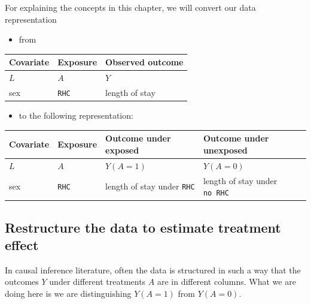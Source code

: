 \documentclass[
]{book}
\providecommand{\tightlist}{%
  \setlength{\itemsep}{0pt}\setlength{\parskip}{0pt}}
\begin{document}
\begin{rmdcomment}
For explaining the concepts in this chapter, we will convert our data
representation
\end{rmdcomment}

\begin{itemize}
\tightlist
\item
  from
\end{itemize}

\begin{longtable}[]{@{}lll@{}}
\toprule
Covariate & Exposure & Observed outcome\tabularnewline
\midrule
\endhead
\(L\) & \(A\) & \(Y\)\tabularnewline
sex & \texttt{RHC} & length of stay\tabularnewline
\bottomrule
\end{longtable}

\begin{itemize}
\tightlist
\item
  to the following representation:
\end{itemize}

\begin{longtable}[]{@{}llll@{}}
\toprule
Covariate & Exposure & Outcome under exposed & Outcome under unexposed\tabularnewline
\midrule
\endhead
\(L\) & \(A\) & \(Y(A=1)\) & \(Y(A=0)\)\tabularnewline
sex & \texttt{RHC} & length of stay under \texttt{RHC} & length of stay under \texttt{no\ RHC}\tabularnewline
\bottomrule
\end{longtable}

\hypertarget{restructure-the-data-to-estimate-treatment-effect}{%
\subsection{Restructure the data to estimate treatment effect}\label{restructure-the-data-to-estimate-treatment-effect}}

In causal inference literature, often the data is structured in such a way that the outcomes \(Y\) under different treatments \(A\) are in different columns. What we are doing here is we are distinguishing \(Y(A=1)\) from \(Y(A=0)\).
\end{document}
